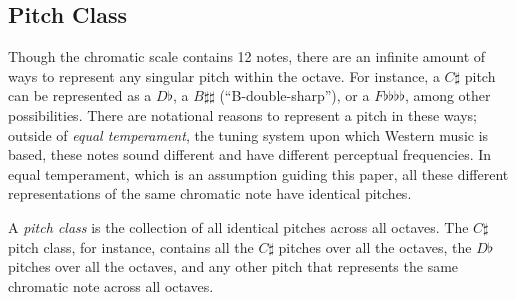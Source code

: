 \subsection{Pitch Class}

Though the chromatic scale contains 12 notes, there are an infinite amount
of ways to represent any singular pitch within the octave. For instance,
a $C\sharp$ pitch can be represented as a $D\flat$, a $B\sharp\sharp$ (``B-double-sharp''),
or a $F\flat\flat\flat\flat$, among other possibilities. There are notational
reasons to represent a pitch in these ways; outside of \textit{equal temperament},
the tuning system upon which Western music is based, these notes sound different
and have different perceptual frequencies. In equal temperament, which is
an assumption guiding this paper, all these different representations of
the same chromatic note have identical pitches.

A \textit{pitch class} is the collection of all identical pitches across
all octaves. The $C\sharp$ pitch class, for instance, contains all the $C\sharp$
pitches over all the octaves, the $D\flat$ pitches over all the octaves,
and any other pitch that represents the same chromatic note across all octaves.